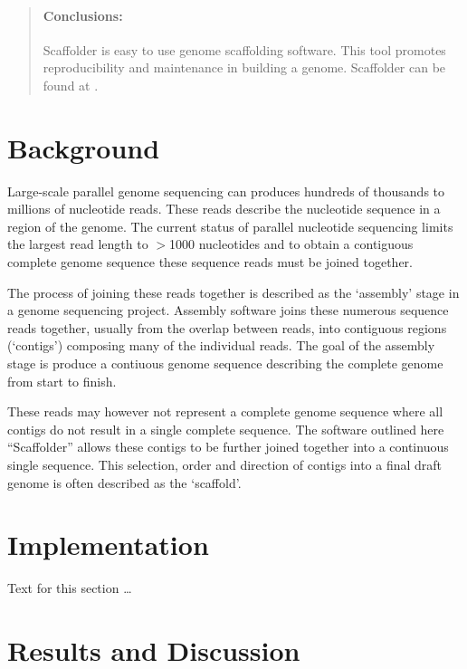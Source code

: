 \documentclass[10pt]{bmc_article}
\newenvironment{bmcformat}{\begin{raggedright}\baselineskip20pt\sloppy\setboolean{publ}{false}}{\end{raggedright}\baselineskip20pt\sloppy}
\begin{document}
\begin{bmcformat}
\begin{abstract}
  \paragraph*{Conclusions:} Scaffolder is easy to use genome scaffolding
  software. This tool promotes reproducibility and maintenance in building
  a genome. Scaffolder can be found at \scaffolder.

\end{abstract}


\section*{Background} %

Large-scale parallel genome sequencing can produces hundreds of thousands to
millions of nucleotide reads. These reads describe the nucleotide sequence in
a region of the genome. The current status of parallel nucleotide sequencing
limits the largest read length to $>$1000 nucleotides and to obtain
a contiguous complete genome sequence these sequence reads must be joined
together. \pb

The process of joining these reads together is described as the `assembly'
stage in a genome sequencing project. Assembly software joins these numerous
sequence reads together, usually from the overlap between reads, into
contiguous regions (`contigs') composing many of the individual reads. The goal
of the assembly stage is produce a contiuous genome sequence describing the
complete genome from start to finish. \pb

These reads may however not represent a complete genome sequence where all
contigs do not result in a single complete sequence. The software outlined here
``Scaffolder'' allows these contigs to be further joined together into
a continuous single sequence. This selection, order and direction of contigs
into a final draft genome is often described as the `scaffold'. \pb

\section*{Implementation} %

  Text for this section \ldots
\section*{Results and Discussion} %


\end{bmcformat}
\end{document}
